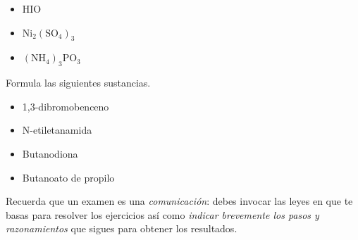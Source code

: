 \documentclass[a4paper,addpoints,14pt]{exam}
\newcommand*\chem[1]{\ensuremath{\mathrm{#1}}}
\begin{document}
\begin{questions}
\begin{question}[2]
\begin{itemize}
		\item $\chem{HIO}$
		\vspace{50pt}
		
		\item $\chem{Ni_2(SO_4)_3}$\vspace{50pt}
		
		\item $\chem{(NH_4)_3PO_3}$\vspace{50pt}
		
	
	\end{itemize}
\end{question}



\begin{question}[1] Formula las siguientes sustancias. 

		\begin{itemize}
		\item 1,3-dibromobenceno\vspace{50pt}
		
		\item N-etiletanamida\vspace{50pt}
		
		\item Butanodiona\vspace{50pt}
		
		\item Butanoato de propilo\vspace{50pt}
		
				
		
		
		
	\end{itemize}
\end{question}


	
\begin{problemas}{Recuerda que un examen es una \textit{comunicación}: debes invocar las leyes en que te basas para resolver los ejercicios así como \textit{indicar brevemente los pasos y razonamientos} que sigues para obtener los resultados.}
\end{problemas}
\vspace{3ex}


\end{questions}
\end{document}
